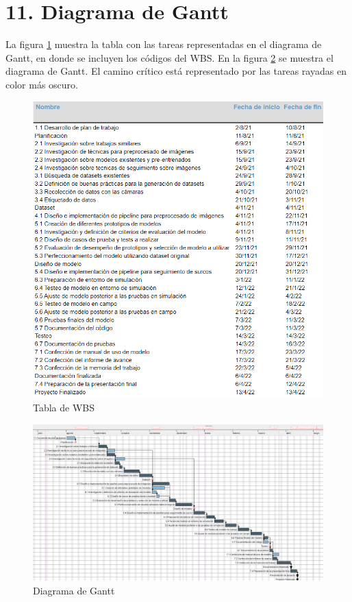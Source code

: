 \documentclass[
11pt, %
]{charter}
\begin{document}
\section{11. Diagrama de Gantt}
\label{sec:gantt}

La figura \ref{fig:gantt_tabla} muestra la tabla con las tareas representadas en el diagrama de Gantt, en donde se incluyen los códigos del WBS. En la figura \ref{fig:diagGantt} se muestra el diagrama de Gantt. El camino crítico está representado por las tareas rayadas en color más oscuro.

\begin{figure}[htpb]
\centering 
\includegraphics[width=1\textwidth]{./Figuras/gantt_tabla.png}
\caption{Tabla de WBS}
\label{fig:gantt_tabla}
\end{figure}


\begin{landscape}
\begin{figure}[htpb]
\centering 
\includegraphics[height=.85\textheight]{./Figuras/gantt.png}
\caption{Diagrama de Gantt}
\label{fig:diagGantt}
\end{figure}
\end{landscape}
\end{document}
